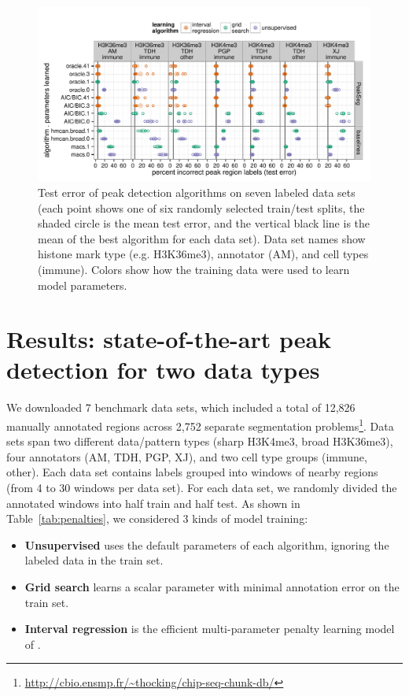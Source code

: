 \documentclass{article}
\begin{document}
\begin{figure}[b!]
  \centering
  \includegraphics[width=\textwidth]{figure-dp-peaks-regression-dots}
  \vskip -0.5cm
  \caption{Test error of peak detection algorithms on seven labeled
    data sets (each point shows one of six randomly selected
    train/test splits, the shaded circle is the mean test error, and
    the vertical black line is the mean of the best algorithm for each
    data set). Data set names show histone mark type (e.g. H3K36me3),
    annotator (AM), and cell types (immune). Colors show how the
    training data were used to learn model parameters.}
  \label{fig:test-error}
\end{figure}

\section{Results: state-of-the-art peak detection
  for two data types}
\label{sec:results}

We downloaded 7 benchmark data sets, which included a total of 12,826
manually annotated regions across 2,752 separate segmentation
problems\footnote{\url{http://cbio.ensmp.fr/~thocking/chip-seq-chunk-db/}}.
Data sets span two different data/pattern types (sharp H3K4me3, broad
H3K36me3), four annotators (AM, TDH, PGP, XJ), and two cell
type groups (immune, other). Each data set contains labels grouped
into windows of nearby regions (from 4 to 30 windows per data
set). For each data set, we randomly divided the annotated windows
into half train and half test.  As shown in Table~\ref{tab:penalties},
we considered 3 kinds of model training:
\begin{itemize}
\item \textbf{Unsupervised} uses the default parameters of each
  algorithm, ignoring the labeled data in the train set.
\item \textbf{Grid search} learns a scalar parameter with minimal
  annotation error on the train set.
\item \textbf{Interval regression} is the efficient multi-parameter
  penalty learning model of \citet{HOCKING-penalties}.
\end{itemize}
\end{document}
